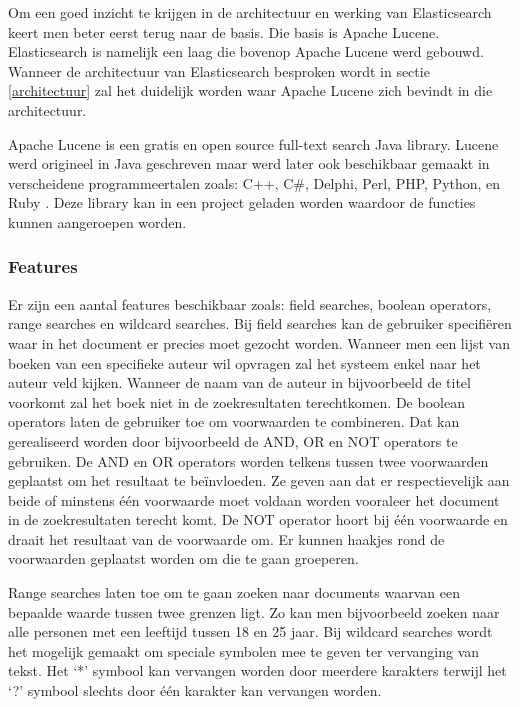 Om een goed inzicht te krijgen in de architectuur en werking van Elasticsearch keert men beter eerst terug naar de basis. Die basis is Apache Lucene. Elasticsearch is namelijk een laag die bovenop Apache Lucene werd gebouwd. Wanneer de architectuur van Elasticsearch besproken wordt in sectie \ref{architectuur} zal het duidelijk worden waar Apache Lucene zich bevindt in die architectuur.

Apache Lucene is een gratis en open source full-text search Java library. Lucene werd origineel in Java geschreven maar werd later ook beschikbaar gemaakt in verscheidene programmeertalen zoals: C++, C\#, Delphi, Perl, PHP, Python, en Ruby \autocite{Whissel2009}. Deze library kan in een project geladen worden waardoor de functies kunnen aangeroepen worden.

\subsubsection{Features}

Er zijn een aantal features beschikbaar zoals: field searches, boolean operators, range searches en wildcard searches. Bij field searches kan de gebruiker specifiëren waar in het document er precies moet gezocht worden. Wanneer men een lijst van boeken van een specifieke auteur wil opvragen zal het systeem enkel naar het auteur veld kijken. Wanneer de naam van de auteur in bijvoorbeeld de titel voorkomt zal het boek niet in de zoekresultaten terechtkomen. De boolean operators laten de gebruiker toe om voorwaarden te combineren. Dat kan gerealiseerd worden door bijvoorbeeld de AND, OR en NOT operators te gebruiken. De AND en OR operators worden telkens tussen twee voorwaarden geplaatst om het resultaat te beïnvloeden. Ze geven aan dat er respectievelijk aan beide of minstens één voorwaarde moet voldaan worden vooraleer het document in de zoekresultaten terecht komt. De NOT operator hoort bij één voorwaarde en draait het resultaat van de voorwaarde om. Er kunnen haakjes rond de voorwaarden geplaatst worden om die te gaan groeperen.

Range searches laten toe om te gaan zoeken naar documents waarvan een bepaalde waarde tussen twee grenzen ligt. Zo kan men bijvoorbeeld zoeken naar alle personen met een leeftijd tussen 18 en 25 jaar. Bij wildcard searches wordt het mogelijk gemaakt om speciale symbolen mee te geven ter vervanging van tekst. Het ‘*’ symbool kan vervangen worden door meerdere karakters terwijl het ‘?’ symbool slechts door één karakter kan vervangen worden. 

